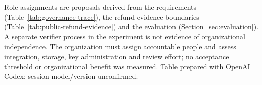 \begin{table}[!htbp]
\begin{tabularx}{\textwidth}{@{}>{\raggedright\arraybackslash}p{32mm}>{\raggedright\arraybackslash}X>{\raggedright\arraybackslash}X@{}}
\end{tabularx}
\par\smallskip\noindent\begin{minipage}{\textwidth}
Role assignments are proposals derived from the requirements (Table~\ref{tab:governance-trace}), the refund evidence boundaries (Table~\ref{tab:public-refund-evidence}) and the evaluation (Section~\ref{sec:evaluation}). A separate verifier process in the experiment is not evidence of organizational independence. The organization must assign accountable people and assess integration, storage, key administration and review effort; no acceptance threshold or organizational benefit was measured. Table prepared with OpenAI Codex; session model/version unconfirmed.
\end{minipage}
\endgroup
\end{table}
